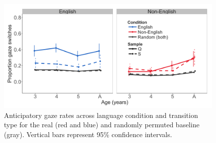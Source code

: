 \documentclass[authoryear, 12pt]{elsarticle}
\begin{document}
\begin{figure}[h]
\begin{center}
\includegraphics[width=1\textwidth]{figures/E1-samples-by-lang-groups-trans-types.png}
\end{center}
\caption{Anticipatory gaze rates across language condition and transition type for the real (red and blue) and randomly permuted baseline (gray). Vertical bars represent 95\% confidence intervals.} 
\label{fig:E1-randvsreal}
\end{figure}
\end{document}
